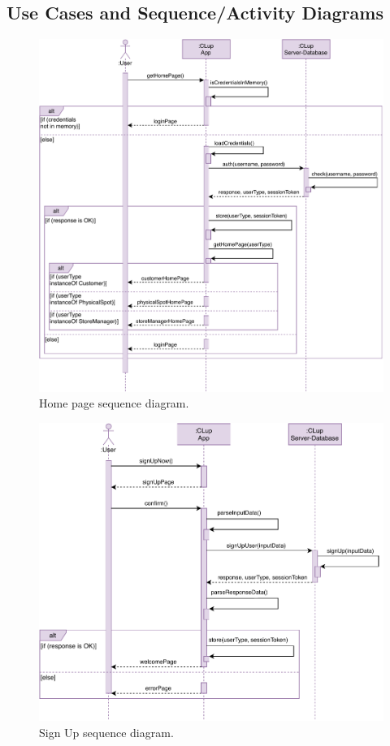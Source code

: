 \subsection{Use Cases and Sequence/Activity Diagrams}

\begin{figure}[H]
	\centering
	\includegraphics[width=1.0\textwidth]{images/getHomePage_sequence_diagram.pdf}
	\caption{Home page sequence diagram.}
\end{figure}

\begin{figure}[H]
	\centering
	\includegraphics[width=1.0\textwidth]{images/signUp_sequence_diagram.pdf}
	\caption{Sign Up sequence diagram.}
\end{figure}

